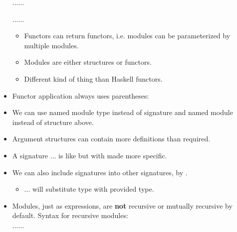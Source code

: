 \documentclass{beamer}
\newcommand{\tmstrong}[1]{\textbf{#1}}
\newcommand{\tmverbatim}[1]{\text{{\ttfamily{#1}}}}
\begin{document}
\begin{itemize}
  {}{}{\hlopt{= }}{}{\hlopt{(}}{}{\hlopt{: }}{}...{}{\hlopt{) -> }}{}...{}
  
  {}{}{\hlopt{(}}{}{\hlopt{:
  }}{}...{}{\hlopt{) = }}{}...{}
  \begin{itemize}
    \item Functors can return functors, i.e. modules can be parameterized by
    multiple modules.
    
    \item Modules are either structures or functors.
    
    \item Different kind of thing than Haskell functors.
  \end{itemize}
  \item Functor application always uses parentheses: {}{\hlopt{(}}{}{}{}{\hlopt{)}}
  
  \item We can use named module type instead of signature and named module
  instead of structure above.
  
  \item Argument structures can contain more definitions than required.
  
  \item A signature {}{}{}{\hlopt{ =}} ... is like
  {}but with \tmverbatim{t\_name} made
  more specific.
  
  \item We can also include signatures into other signatures, by
  {}{}.
  \begin{itemize}
    \item {}{}{}{}{\hlopt{:= }}... will substitute
    type \tmverbatim{t\_name} with provided type.
  \end{itemize}
  \item Modules, just as expressions, are {\tmstrong{not}} recursive or
  mutually recursive by default. Syntax for recursive modules:\\
  {}{}{\hlopt{:
  }}{}{\hlopt{= }}...{}...
  

\end{itemize}
\end{document}
